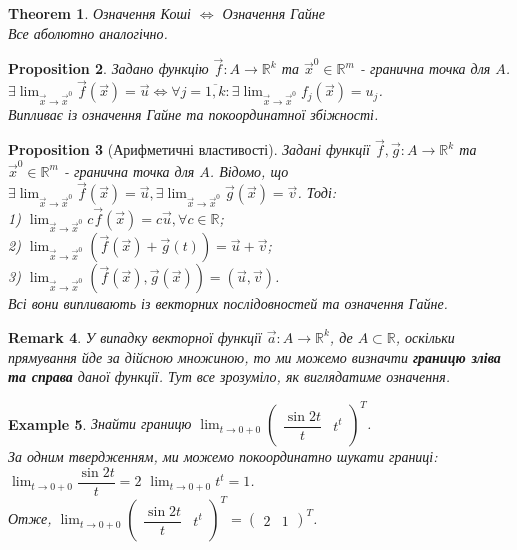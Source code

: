 \documentclass[a4paper, 10pt]{article}
\def\huge{\displaystyle}
\theoremstyle{theoremdd}
\newtheorem{theorem}{Theorem}[subsection]
\theoremstyle{theoremdd}
\theoremstyle{theoremdd}
\theoremstyle{theoremdd}
\theoremstyle{theoremdd}
\newtheorem{example}[theorem]{Example}
\theoremstyle{theoremdd}
\newtheorem{proposition}[theorem]{Proposition}
\theoremstyle{theoremdd}
\newtheorem{remark}[theorem]{Remark}
\theoremstyle{theoremdd}
\theoremstyle{theoremdd}
\begin{document}
\begin{theorem}
Означення Коші $\iff$ Означення Гайне\\
\textit{Все аболютно аналогічно.}
\end{theorem}

\begin{proposition}
Задано функцію $\vec{f}: A \to \mathbb{R}^k$ та $\vec{x}^0 \in \mathbb{R}^m$ - гранична точка для $A$.\\
$\exists \huge\lim_{\vec{x} \to \vec{x}^0} \vec{f}(\vec{x}) = \vec{u} \iff \forall j = \overline{1,k}: \exists \lim_{\vec{x} \to \vec{x}^0} f_j(\vec{x}) = u_j$.\\
\textit{Випливає із означення Гайне та покоординатної збіжності.}
\end{proposition}

\begin{proposition}[Арифметичні властивості]
Задані функції $\vec{f},\vec{g}: A \to \mathbb{R}^k$ та $\vec{x}^0 \in \mathbb{R}^m$ - гранична точка для $A$. Відомо, що \\ $\exists \huge \lim_{\vec{x} \to \vec{x}^0} \vec{f}(\vec{x}) = \vec{u}, \exists \lim_{\vec{x} \to \vec{x}^0} \vec{g}(\vec{x}) = \vec{v}$. Тоді:\\
1) $\huge \lim_{\vec{x} \to \vec{x}^0} c \vec{f}(\vec{x}) = c \vec{u}, \forall c \in \mathbb{R}$;\\
2) $\huge \lim_{\vec{x} \to \vec{x}^0} (\vec{f}(\vec{x}) + \vec{g}(t)) = \vec{u} + \vec{v}$;\\
3) $\huge \lim_{\vec{x} \to \vec{x}^0} (\vec{f}(\vec{x}),\vec{g}(\vec{x})) = (\vec{u},\vec{v})$.\\
\textit{Всі вони випливають із векторних послідовностей та означення Гайне.}
\end{proposition}

\begin{remark}
У випадку векторної функції $\vec{a}: A \to \mathbb{R}^k$, де $A \subset \mathbb{R}$, оскільки прямування йде за дійсною множиною, то ми можемо визначти \textbf{границю зліва та справа} даної функції. Тут все зрозуміло, як виглядатиме означення.
\end{remark}

\begin{example}
Знайти границю $\huge\lim_{t \to 0+0} \begin{pmatrix}
\dfrac{\sin 2t}{t} & t^t
\end{pmatrix}^T$.\\
За одним твердженням, ми можемо покоординатно шукати границі:\\
$\huge\lim_{t \to 0+0} \dfrac{\sin 2t}{t} = 2$ \hspace{1cm} $\huge\lim_{t \to 0+0} t^t = 1$.\\
Отже, $\huge\lim_{t \to 0+0} \begin{pmatrix}
\dfrac{\sin 2t}{t} & t^t
\end{pmatrix}^T = \begin{pmatrix}
2 & 1
\end{pmatrix}^T$.
\end{example}
\end{document}
